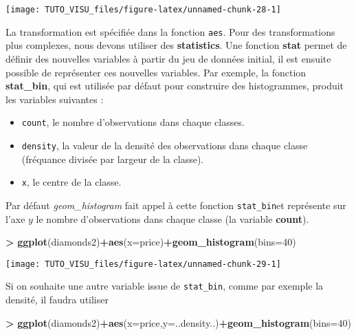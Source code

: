\documentclass[]{article}
\newenvironment{Shaded}{\begin{snugshade}}{\end{snugshade}}
\newcommand{\DataTypeTok}[1]{\textcolor[rgb]{0.13,0.29,0.53}{#1}}
\newcommand{\DecValTok}[1]{\textcolor[rgb]{0.00,0.00,0.81}{#1}}
\newcommand{\KeywordTok}[1]{\textcolor[rgb]{0.13,0.29,0.53}{\textbf{#1}}}
\newcommand{\NormalTok}[1]{#1}
\newcommand{\OperatorTok}[1]{\textcolor[rgb]{0.81,0.36,0.00}{\textbf{#1}}}
\newcommand{\StringTok}[1]{\textcolor[rgb]{0.31,0.60,0.02}{#1}}
\providecommand{\tightlist}{%
  \setlength{\itemsep}{0pt}\setlength{\parskip}{0pt}}
\theoremstyle{definition}
\theoremstyle{definition}
\theoremstyle{definition}
\theoremstyle{remark}
\begin{document}
\begin{center}\texttt{[image: TUTO\_VISU\_files/figure-latex/unnamed-chunk-28-1]} \end{center}

La transformation est spécifiée dans la fonction \texttt{aes}. Pour des transformations plus complexes, nous devons utiliser des \textbf{statistics}. Une fonction \textbf{stat} permet de définir des nouvelles variables à partir du jeu de données initial, il est ensuite possible de représenter ces nouvelles variables.
Par exemple, la fonction \textbf{stat\_bin}, qui est utilisée par défaut pour construire des histogrammes, produit les variables suivantes :

\begin{itemize}
\tightlist
\item
  \texttt{count}, le nombre d'observations dans chaque classes.
\item
  \texttt{density}, la valeur de la densité des observations dans chaque classe (fréquance divisée par largeur de la classe).
\item
  \texttt{x}, le centre de la classe.
\end{itemize}

Par défaut \emph{geom\_histogram} fait appel à cette fonction \texttt{stat\_bin}et représente sur l'axe \(y\) le nombre d'observations dans chaque classe (la variable \textbf{count}).

\begin{Shaded}
\begin{Highlighting}[]
\OperatorTok{>}\StringTok{ }\KeywordTok{ggplot}\NormalTok{(diamonds2)}\OperatorTok{+}\KeywordTok{aes}\NormalTok{(}\DataTypeTok{x=}\NormalTok{price)}\OperatorTok{+}\KeywordTok{geom_histogram}\NormalTok{(}\DataTypeTok{bins=}\DecValTok{40}\NormalTok{)}
\end{Highlighting}
\end{Shaded}

\begin{center}\texttt{[image: TUTO\_VISU\_files/figure-latex/unnamed-chunk-29-1]} \end{center}

Si on souhaite une autre variable issue de \texttt{stat\_bin}, comme par exemple la densité, il faudra utiliser

\begin{Shaded}
\begin{Highlighting}[]
\OperatorTok{>}\StringTok{ }\KeywordTok{ggplot}\NormalTok{(diamonds2)}\OperatorTok{+}\KeywordTok{aes}\NormalTok{(}\DataTypeTok{x=}\NormalTok{price,}\DataTypeTok{y=}\NormalTok{..density..)}\OperatorTok{+}\KeywordTok{geom_histogram}\NormalTok{(}\DataTypeTok{bins=}\DecValTok{40}\NormalTok{)}
\end{Highlighting}
\end{Shaded}
\end{document}
